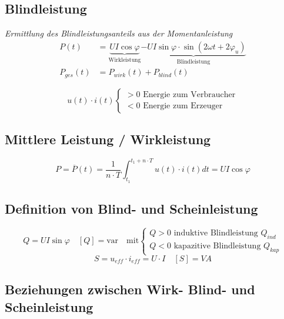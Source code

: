 \subsection*{Blindleistung}
\emph{Ermittlung des Blindleistungsanteils aus der Momentanleistung}
\begin{align*}
P\left(t\right) &= \underbrace{UI\cos\varphi}_{\text{Wirkleistung}}\underbrace{-UI\sin\varphi\cdot\sin\left(2\omega t + 2\varphi_u\right)}_{\text{Blindleistung}} \\
P_{ges}\left(t\right) &= P_{wirk}\left(t\right) + P_{blind}\left(t\right)
\end{align*}

\vspace{0mm}

\[u\left(t\right)\cdot i\left(t\right)
\begin{cases}
>0\text{ Energie zum Verbraucher} \\
<0\text{ Energie zum Erzeuger}
\end{cases}\]

\subsection*{Mittlere Leistung / Wirkleistung}
\[P = \overline{P}\left(t\right) = \frac{1}{n \cdot T} \int_{t_1}^{t_1 + n \cdot T} u\left(t\right) \cdot i\left(t\right) dt = UI\cos\varphi\]

\subsection*{Definition von Blind- und Scheinleistung}
\[Q = UI\sin\varphi \quad \left[Q\right] = \text{var} \quad \text{mit}
\begin{cases}
Q>0\text{ induktive Blindleistung } Q_{ind} \\ 
Q<0\text{ kapazitive Blindleistung } Q_{kap}
\end{cases}
\]
\[S = u_{eff} \cdot i_{eff} = U \cdot I \quad \left[S\right] = VA\]

\subsection*{Beziehungen zwischen Wirk- Blind- und Scheinleistung}

\begin{center}
\end{center}


